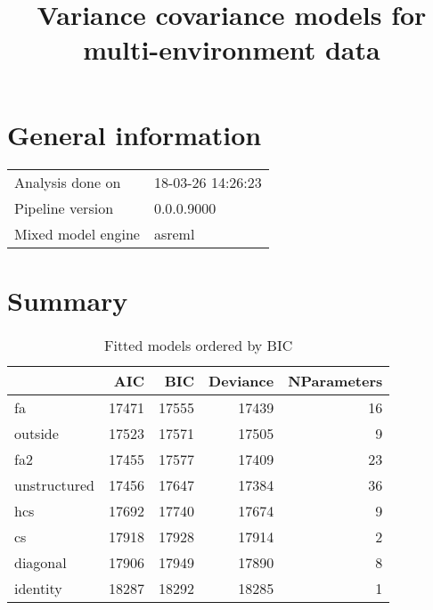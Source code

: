 \documentclass[a4paper,11pt]{article}\usepackage[]{graphicx}\usepackage[]{color}
\title{Variance covariance models for multi-environment data}%
\author{\vspace{-5ex}}
\date{\vspace{-5ex}}
\begin{document}
\maketitle
\singlespacing

\section{General information}
\begin{table}[ht]
\begin{flushleft}
\begin{tabular}{ll}
  Analysis done on & 18-03-26 14:26:23 \\ 
  Pipeline version & 0.0.0.9000 \\ 
  Mixed model engine & asreml \\ 
  \end{tabular}
\label{general}
\end{flushleft}
\end{table}


\section{Summary}
\begin{table}[ht]
\begin{flushleft}
\caption{Fitted models ordered by BIC} 
\label{summary}
\begin{tabular}{lrrrr}
  \hline
 & AIC & BIC & Deviance & NParameters \\ 
  \hline
fa & 17471 & 17555 & 17439 & 16 \\ 
  outside & 17523 & 17571 & 17505 & 9 \\ 
  fa2 & 17455 & 17577 & 17409 & 23 \\ 
  unstructured & 17456 & 17647 & 17384 & 36 \\ 
  hcs & 17692 & 17740 & 17674 & 9 \\ 
  cs & 17918 & 17928 & 17914 & 2 \\ 
  diagonal & 17906 & 17949 & 17890 & 8 \\ 
  identity & 18287 & 18292 & 18285 & 1 \\ 
   \hline
\end{tabular}
\end{flushleft}
\end{table}
\end{document}
